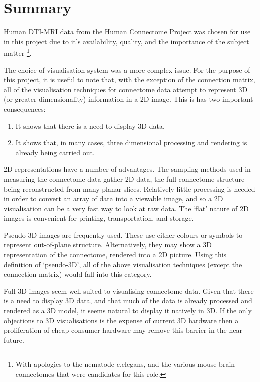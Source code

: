 \documentclass[MSc,paper=a4,pagesize=auto]{icldt}
\begin{document}
\section{Summary}
Human DTI-MRI data from the Human Connectome Project was chosen for use in this project due to it's availability, quality, and the importance of the subject matter \footnote{With apologies to the nematode c.elegans, and the various mouse-brain connectomes that were candidates for this role.}. 

The choice of visualisation system was a more complex issue. For the purpose of this project, it is useful to note that, with the exception of the connection matrix, all of the visualisation techniques for connectome data attempt to represent 3D (or greater dimensionality) information in a 2D image. This is has two important consequences:
\begin{enumerate}
\item It shows that there is a need to display 3D data.
\item It shows that, in many cases, three dimensional processing and rendering is already being carried out.
\end{enumerate}

2D representations have a number of advantages. The sampling methods used in measuring the connectome data gather 2D data, the full connectome structure being reconstructed from many planar slices. Relatively little processing is needed in order to convert an array of data into a viewable image, and so a 2D visualisation can be a very fast way to look at raw data. The ‘flat’ nature of 2D images is convenient for printing, transportation, and storage. 

Pseudo-3D images are frequently used. These use either colours or symbols to represent out-of-plane structure. Alternatively, they may show a 3D representation of the connectome, rendered into a 2D picture. Using this definition of ‘pseudo-3D’, all of the above visualisation techniques (except the connection matrix) would fall into this category. 

Full 3D images seem well suited to visualising connectome data. Given that there is a need to display 3D data, and that much of the data is already processed and rendered as a 3D model, it seems natural to display it natively in 3D. If the only objections to 3D visualisations is the expense of current 3D hardware \cite{Margulies2013} then a proliferation of cheap consumer hardware may remove this barrier in the near future.
\end{document}
